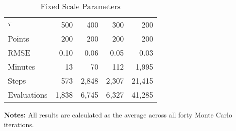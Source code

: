 \begin{table}\onehalfspacing
\begin{center}
\begin{threeparttable}
  \captionsetup{width=30cm}
  \caption{Fixed Scale Parameters}
  \label{Fixed Scale Parameters}
  \begin{tabular}{lrrrr}\toprule
  $\tau$ & 500 &  400 &   300 & 200 \\
  Points      & 200 & 200 & 200  & 200 \\
  \midrule
  RMSE        & 0.10 &   0.06 &    0.05 &  0.03  \\
  Minutes     &  13 &      70 &    112 &   1,995 \\
  Steps       &  573 &   2,848 &    2,307 &  21,415 \\
  Evaluations & 1,838 &   6,745 &    6,327 &  41,285 \\
  \bottomrule
  \end{tabular}\scriptsize
  \begin{tablenotes}\item \textbf{Notes:} All results are calculated as the average across all forty Monte Carlo iterations.
\end{tablenotes}
  \end{threeparttable}
  \end{center}
\end{table}
